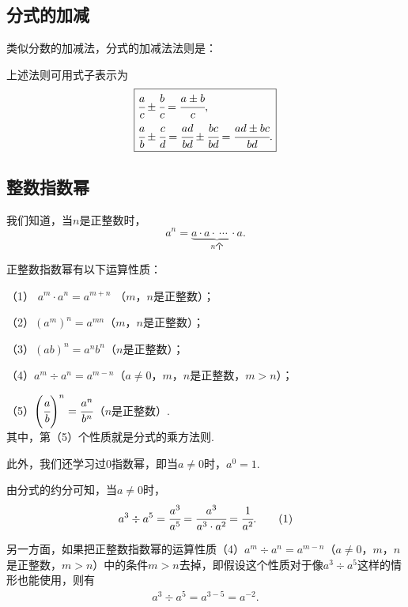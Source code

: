 \documentclass[UTF8,fontset=macnew]{book} %
\begin{document}
			\subsection{分式的加减}
				类似分数的加减法，分式的加减法法则是：
				
				\textcolor{hlblue}{}
				
				\textcolor{hlblue}{}
				
				上述法则可用式子表示为
			$$\boxed{\begin{aligned} &\cfrac{a}{c}\pm  \cfrac{b}{c}=\cfrac{a\pm b}{c} ,\\&\cfrac{a}{b}\pm \cfrac{c}{d}=\cfrac{ad}{bd}\pm \cfrac{bc}{ bd}=\cfrac{ad\pm bc}{bd}.     \end{aligned}} $$
			\subsection{整数指数幂}
				我们知道，当$n$是正整数时，
			$$a^n=\underbrace{a\cdot a\cdot \ \cdots \ \cdot a}_{\text{$n$个} } .$$
			
				正整数指数幂有以下运算性质：
				
				（1） $a^m\cdot a^n=a^{m+n}$ （$m$，$n$是正整数）；
				
				（2）$(a^m)^n=a^{mn}$（$m$，$n$是正整数）；
				
				（3）$(ab)^n=a^nb^n$（$n$是正整数）；
				
				（4）$a^m\div a^n=a^{m-n}$（$a\ne 0$，$m$，$n$是正整数，$m>n$）；
				
				（5）$\left( \cfrac{a}{b} \right)^n =\cfrac{a^n}{b^n} $（$n$是正整数）.\\
			其中，第（5）个性质就是分式的乘方法则.
				
				此外，我们还学习过$0$指数幂，即当$a\ne 0$时，$a^0=1$.
				
				由分式的约分可知，当$a\ne 0$时，
			\begin{align}a^3\div a^5=\cfrac{a^3}{a^5}=\cfrac{a^3}{a^3\cdot a^2}=\cfrac{1}{a^2}.   \tag{1} \end{align}
				
				另一方面，如果把正整数指数幂的运算性质（4）$a^m\div a^n=a^{m-n}$（$a\ne 0$，$m$，$n$是正整数，$m>n$）中的条件$m>n$去掉，即假设这个性质对于像$a^3\div a^5$这样的情形也能使用，则有
			\begin{align}a^3\div a^5=a^{3-5}=a^{-2}.   \tag{2} \end{align}
			
\end{document}
